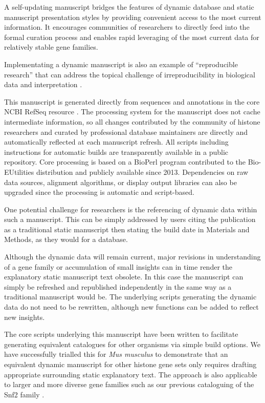   A self-updating manuscript bridges the features of dynamic database and static manuscript
  presentation styles by providing convenient access to the most current information.
  It encourages communities of researchers to directly feed into the formal curation process
  and enables rapid leveraging of the most current data for relatively stable gene families.

  Implementating a dynamic manuscript is also an example of ``reproducible research''
  \citep{reproducible-research-bioinformatics,reproducible-research-law}
  that can address the topical challenge of irreproducibility in biological data
  and interpretation \citep{ErrorProne2012,ince2012case}.

  This manuscript is generated directly from sequences and annotations
  in the core NCBI RefSeq resource \citep{OLearyRefseq2016}.
  The processing system for the manuscript does not cache intermediate information,
  so all changes contributed by the community of histone researchers
  and curated by professional database maintainers
  are directly and automatically reflected at each manuscript refresh.
  All scripts including instructions for automatic builds
  are transparently available in a public repository.
  Core processing is based on a BioPerl program contributed to the Bio-EUtilities distribution
  and publicly available since 2013.
  Dependencies on raw data sources, alignment algorithms, or display output libraries
  can also be upgraded since the processing is automatic and script-based.

  One potential challenge for researchers is the referencing of dynamic data within such a manuscript.
  This can be simply addressed by users citing the publication as a traditional static manuscript
  then stating the build date in Materials and Methods, as they would for a database.

  Although the dynamic data will remain current,
  major revisions in understanding of a gene family or accumulation of small insights
  can in time render the explanatory static manuscript text obsolete.
  In this case the manuscript can simply be refreshed and republished independently
  in the same way as a traditional manuscript would be.
  The underlying scripts generating the dynamic data do not need to be rewritten,
  although new functions can be added to reflect new insights.

  The core scripts underlying this manuscript have been written to facilitate generating
  equivalent catalogues for other organisms via simple build options.
  We have successfully trialled this for
  \textit{Mus musculus} 
  to demonstrate that an equivalent dynamic manuscript for other histone gene sets
  only requires drafting appropriate surrounding static explanatory text.
  The approach is also applicable to larger and more diverse gene families such as
  our previous cataloguing of the Snf2 family \citep{andrew-snf2-catalogue}.
